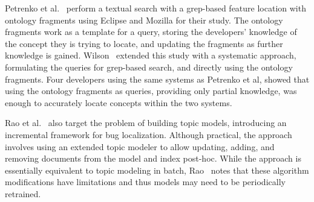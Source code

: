 Petrenko et al.~\cite{Petrenko-etal:2008} perform a textual search with a grep-based
feature location with ontology fragments using Eclipse and Mozilla for their
study. The ontology fragments work as a template for a query, storing the
developers' knowledge of the concept they is trying to locate, and updating the
fragments as further knowledge is gained. Wilson~\cite{Wilson:2010} extended this
study with a systematic approach, formulating the queries for grep-based search, and
directly using the ontology fragments. Four developers using the same systems
as Petrenko et al, showed that using the ontology fragments as queries, providing
only partial knowledge, was enough to accurately locate concepts within the
two systems.

Rao et al.~\cite{Rao-etal:2013} also target the problem of building
topic models, introducing an incremental framework for bug localization.
Although practical, the approach involves using an extended topic modeler to allow
updating, adding, and removing documents from the model and index post-hoc.
While the approach is essentially equivalent to topic modeling in batch,
Rao~\cite{Rao:2013} notes that these algorithm modifications have limitations and
thus models may need to be periodically retrained.
